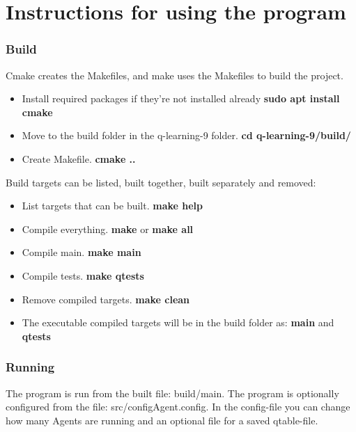 \documentclass{article}
\begin{document}
\section{Instructions for using the program}

\subsubsection{Build}
Cmake creates the Makefiles, and make uses the Makefiles to build the project.

\begin{itemize}
  \item Install required packages if they're not installed already
  \textbf{sudo apt install cmake}

  \item Move to the build folder in the q-learning-9 folder.
  \textbf{cd q-learning-9/build/}

  \item Create Makefile.
  \textbf{cmake ..}
\end{itemize}

Build targets can be listed, built together, built separately and removed:

\begin{itemize}
  \item List targets that can be built. \textbf{make help}

 \item Compile everything. \textbf{make} or \textbf{make all}

 \item Compile main. \textbf{make main}

 \item Compile tests. \textbf{make qtests}

 \item Remove compiled targets. \textbf{make clean}

 \item The executable compiled targets will be in the build folder as:
  \textbf{main} and \textbf{qtests}
\end{itemize}

\subsubsection{Running}
The program is run from the built file: build/main.
The program is optionally configured from the file: src/configAgent.config.
In the config-file you can change how many Agents are running and
an optional file for a saved qtable-file.
\end{document}
